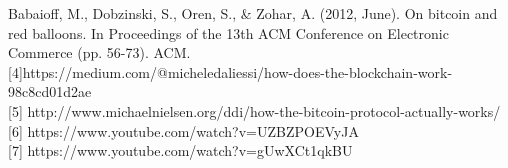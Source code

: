 \documentclass[12pt,a4paper]{report}
\begin{document}
\begin{flushleft}
[3] Babaioff, M., Dobzinski, S., Oren, S., & Zohar, A. (2012, June). On bitcoin and red balloons.
In Proceedings of the 13th ACM Conference on Electronic Commerce (pp. 56-73). ACM.\\

[4]https://medium.com/@micheledaliessi/how-does-the-blockchain-work-98c8cd01d2ae\\

[5] http://www.michaelnielsen.org/ddi/how-the-bitcoin-protocol-actually-works/\\

[6] https://www.youtube.com/watch?v=UZBZPOEVyJA\\

[7] https://www.youtube.com/watch?v=gUwXCt1qkBU






\end{flushleft}
\end{document}
